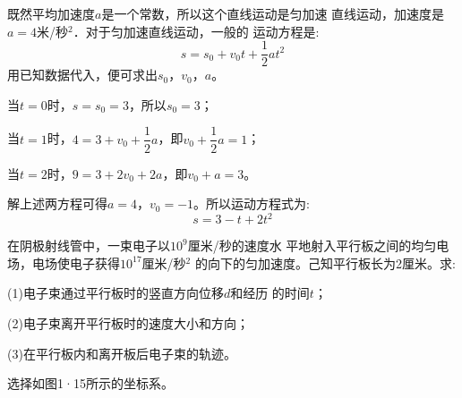 \noindent 既然平均加速度$a$是一个常数，所以这个直线运动是匀加速
直线运动，加速度是$a=4$米/秒$^2$．对于匀加速直线运动，一般的
运动方程是:
\begin{equation*}
    s=s_0+v_{0}t+\frac{1}{2}at^2
\end{equation*}
用已知数据代入，便可求出$s_0$，$v_0$，$a$。

当$t=0$时，$s=s_0=3$，所以$s_0=3$；

当$t=1$时，$4=3+v_0+\dfrac 1 2 a$，即$v_0+\dfrac 1 2 a=1$；

当$t=2$时，$9=3+2v_0+2a$，即$v_0+a=3$。

解上述两方程可得$a=4$，$v_0=-1$。所以运动方程式为:
\begin{equation*}
    s=3-t+2t^2
\end{equation*}

 在阴极射线管中，一束电子以$10^9$厘米/秒的速度水
平地射入平行板之间的均匀电场，电场使电子获得$10^17$厘米/秒$^2$
的向下的匀加速度。己知平行板长为2厘米。求:

(1)电子束通过平行板时的竖直方向位移$d$和经历
的时间$t$；

(2)电子束离开平行板时的速度大小和方向；

(3)在平行板内和离开板后电子束的轨迹。

\solution 选择如图1·15所示的坐标系。

